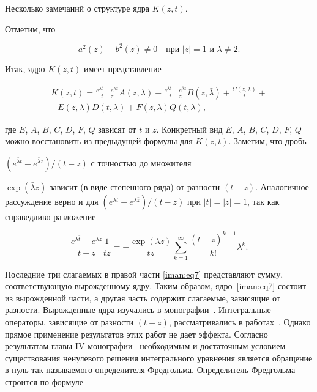 Несколько замечаний о структуре ядра $K(z,t)$. 

Отметим, что 

$$a^2 (z) - b^2 (z) \ne 0\quad \text{при $|z| = 1$ и $\lambda  \ne 2$}.$$ 

Итак, ядро $K(z,t)$ имеет представление

\begin{multline}

\label{iman:eq7}

K(z,t) = \frac{e^{\lambda \bar t}  - e^{\lambda \bar z} }{t - z}A(z,\lambda ) + \frac{e^{\bar \lambda t}  - e^{\bar \lambda z}}{t - z}B(z,\bar \lambda ) + \frac{C(z,\lambda )}{t} +\\

+ E(z,\lambda )D(t,\lambda) + F(z,\lambda )Q(t,\lambda ),

\end{multline}

где  $E$, $A$, $B$, $C$, $D$, $F$, $Q$  зависят от $t$ и $z$. Конкретный вид $E$, $A$, $B$, $C$, $D$, $F$, $Q$ можно восстановить из предыдущей формулы для $K(z,t)$. Заметим, что дробь

$({e^{\bar \lambda t}  - e^{\bar \lambda z} })/({t - z})$ с точностью до множителя

$\exp (\bar \lambda z)$ зависит (в виде степенного ряда) от разности $(t-z)$. Аналогичное рассуждение верно и для $({e^{\lambda \bar t}  - e^{\lambda \bar z}})/({t - z})$ при $|t| = |z| = 1$, так как справедливо разложение

\[

\frac{e^{\lambda \bar t}  - e^{\lambda \bar z}}{t - z}   \frac{1}{tz} =  - \frac{\exp (\lambda \bar z)}{tz}   \sum\limits_{k = 1}^\infty  \frac{(\bar t - \bar z)^{k - 1} }{k!}\lambda ^k.

\]



Последние три слагаемых в правой части \eqref{iman:eq7} представляют сумму, соответствующую вырожденному ядру. Таким образом, ядро~\eqref{iman:eq7} состоит из вырожденной части, а другая часть содержит слагаемые, зависящие от разности. Вырожденные ядра изучались в монографии~\cite{iman:bib14}. Интегральные операторы, зависящие от разности $(t-z)$, рассматривались в работах~\cite{iman:bib16,iman:bib17}. Однако прямое применение  результатов этих работ не дает эффекта. Согласно результатам главы IV монографии~\cite{iman:bib14} необходимым и достаточным условием существования ненулевого решения интегрального уравнения является обращение в нуль так называемого определителя Фредгольма. Определитель Фредгольма строится по формуле

